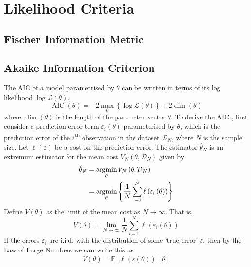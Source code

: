 \documentclass[11pt]{report} %
\begin{document}
\section{Likelihood Criteria}

\subsection{Fischer Information Metric}

\subsection{Akaike Information Criterion}

The AIC of a model parametrised by $\theta$ can be written in terms of its log likelihood $\log\mathcal{L}\left(\theta\right)$.
\begin{equation}
\operatorname{AIC}\left(\theta\right) = -2\max_{\theta}\left\{\log\mathcal{L}\left(\theta\right)\right\} + 2\dim\left(\theta\right)
\end{equation}
where $\dim\left(\theta\right)$ is the length of the parameter vector $\theta$. To derive the AIC \cite{Ljung1999}, first consider a prediction error term $\varepsilon_{i}\left(\theta\right)$ parameterised by $\theta$, which is the prediction error of the $i$\textsuperscript{th} observation in the dataset $\mathcal{D}_{N}$, where $N$ is the sample size. Let $\ell\left(\varepsilon\right)$ be a cost on the prediction error. The estimator $\hat{\theta}_{N}$ is an extremum estimator for the mean cost $V_{N}\left(\theta, \mathcal{D}_{N}\right)$ given by
\begin{align}
\hat{\theta}_{N} &= \operatorname*{argmin}_{\theta}V_{N}\left(\theta, \mathcal{D}_{N}\right) \\
&= \operatorname*{argmin}_{\theta}\left\{\dfrac{1}{N}\sum_{i = 1}^{N}\ell\left(\varepsilon_{i}\left(\theta\right)\right)\right\}
\end{align}
Define $\bar{V}\left(\theta\right)$ as the limit of the mean cost as $N\to\infty$. That is,
\begin{equation}
\bar{V}\left(\theta\right) = \lim_{N\to\infty}\dfrac{1}{N}\sum_{i = 1}^{N}\ell\left(\varepsilon_{i}\left(\theta\right)\right)
\end{equation}
If the errors $\varepsilon_{i}$ are i.i.d. with the distribution of some `true error' $\varepsilon$, then by the Law of Large Numbers we can write this as:
\begin{equation}
\bar{V}\left(\theta\right) = \mathbb{E}\left[\ell\left(\varepsilon\left(\theta\right)\right)\middle|\theta\right]
\end{equation}
\end{document}
